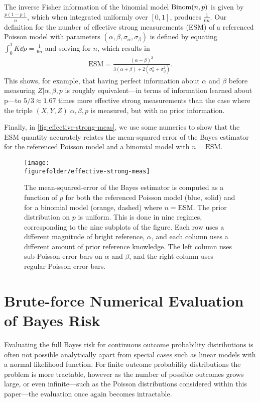 \documentclass[aps,nofootinbib,twocolumn,superscriptaddress]{revtex4}
\newcommand{\figurefolder}{../fig}
\newcommand{\ESM}{\text{ESM}}
\begin{document}
The inverse Fisher information of the binomial model $\operatorname{Binom}(n,p)$
is given by $\frac{p(1-p)}{n}$, which when integrated uniformly over
$[0,1]$, produces $\frac{1}{6n}$.
Our definition for the number of effective strong measurements (ESM)
of a referenced Poisson model with parameters
$(\alpha,\beta,\sigma_\alpha,\sigma_\beta)$ is defined by
equating $\int_0^1 K\dd p=\frac{1}{6n}$ and solving for $n$,
which results in
\begin{align}
   \ESM = \frac{
            (\alpha-\beta)^2
        }{
            3(\alpha+\beta)+2\left(\sigma_\alpha^2+\sigma_\beta^2\right)
        }.
\end{align}
This shows, for example,
that having perfect information about $\alpha$ and $\beta$
before measuring $Z|\alpha,\beta,p$ is roughly equivalent---in terms
of information learned about p---to
$5/3\approx 1.67$ times more effective strong measurements
than the case where the triple $(X,Y,Z)|\alpha,\beta,p$ is
measured, but with no prior information.

Finally, in \autoref{fig:effective-strong-meas}, we use some numerics
to show that the $\ESM$
quantity accurately relates the mean-squared error of the Bayes estimator
for the referenced Poisson model and a binomial model with $n=\ESM$.

\begin{figure}
    \texttt{[image: \\figurefolder/effective-strong-meas]}
    \caption{The mean-squared-error of the Bayes estimator is computed
    as a function of $p$
    for both the referenced Poisson model (blue, solid) and for a binomial model
    (orange, dashed) where $n=\ESM$.
    The prior distribution on $p$ is uniform.
    This is done in nine regimes, corresponding to the nine subplots of the figure.
    Each row uses a different magnitude of bright reference, $\alpha$,
    and each column uses a different amount of prior reference knowledge.
    The left column uses sub-Poisson error bars on $\alpha$ and $\beta$,
    and the right column uses regular Poisson error bars.}
    \label{fig:effective-strong-meas}
\end{figure}

\section{Brute-force Numerical Evaluation of Bayes Risk}
\label{apx:brute-force-bayes-risk}

Evaluating the full Bayes risk for continuous outcome probability distributions
is often not possible analytically apart from special cases such as linear
models with a normal likelihood function.
For finite outcome probability distributions the problem is more tractable,
however as the number of possible outcomes grows large, or even infinite---such
as the Poisson distributions considered within this paper---the evaluation once
again becomes intractable.
\end{document}
